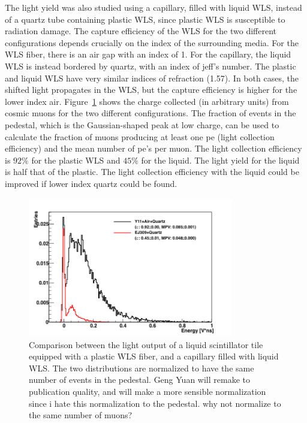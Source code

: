 \documentclass[review]{elsarticle}
\begin{document}
The light yield was also studied using a capillary, filled
with liquid WLS, instead of a quartz tube containing plastic WLS, since
plastic WLS is susceptible to radiation damage.
The capture efficiency of the WLS for the two different configurations
depends crucially on the index of the surrounding media.  For the WLS fiber,
there is an air gap with an index of 1.  For the capillary, the liquid WLS
is instead bordered by quartz, with an index of {\color{red} jeff's number}.
The plastic and liquid WLS have very similar
indices of refraction (1.57).  In both cases, the shifted light propagates
in the WLS, but the capture efficiency is higher for the lower index air.
Figure~\ref{fig:y11_vs_cap} shows the charge collected (in arbitrary units)
from cosmic muons for the two different configurations.  The fraction of
events in the pedestal, which is the Gaussian-shaped peak at low charge,
can be used to calculate the fraction of muons producing at least one pe
(light collection efficiency)
and the mean number of pe's per muon.
The light collection efficiency
is  $92\%$ for the plastic WLS and  $45\%$ for the liquid.  The light
yield for the liquid is half that of the plastic.
The light collection efficiency with the liquid could be improved
if lower index quartz
could be found.

\begin{figure}[!ht]
\begin{center}
\includegraphics[width=0.8\textwidth]{./figures/list_RO_FIBER_all_norm.png}
\caption{Comparison between the light output of a liquid scintillator
  tile equipped with a plastic WLS fiber, and a capillary filled with
  liquid WLS. The two distributions are normalized to have the same
  number of events in the pedestal.{\color{red} Geng Yuan will remake to publication quality, and will make a more sensible normalization since i hate this normalization to the pedestal.  why not normalize to the same number of muons?}}
\label{fig:y11_vs_cap}
\end{center}
\end{figure}
\end{document}
